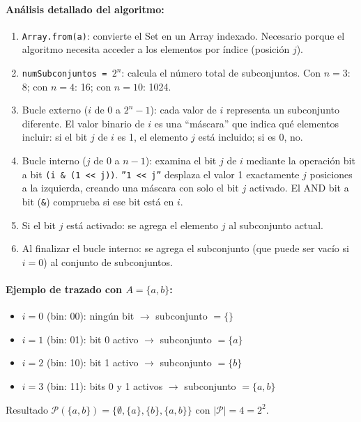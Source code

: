 \documentclass[11pt,a4paper]{article}
\begin{document}
\paragraph{Análisis detallado del algoritmo:}
\begin{enumerate}[noitemsep]
    \item \texttt{Array.from(a)}: convierte el Set en un Array indexado. Necesario porque el algoritmo necesita acceder a los elementos por índice (posición $j$).
    \item \texttt{numSubconjuntos = $2^n$}: calcula el número total de subconjuntos. Con $n=3$: 8; con $n=4$: 16; con $n=10$: 1024.
    \item Bucle externo ($i$ de 0 a $2^n-1$): cada valor de $i$ representa un subconjunto diferente. El valor binario de $i$ es una ``máscara'' que indica qué elementos incluir: si el bit $j$ de $i$ es 1, el elemento $j$ está incluido; si es 0, no.
    \item Bucle interno ($j$ de 0 a $n-1$): examina el bit $j$ de $i$ mediante la operación bit a bit \texttt{(i \& (1 \textless{}\textless{} j))}. \texttt{''1 \textless{}\textless{} j''} desplaza el valor 1 exactamente $j$ posiciones a la izquierda, creando una máscara con solo el bit $j$ activado. El AND bit a bit (\texttt{\&}) comprueba si ese bit está en $i$.
    \item Si el bit $j$ está activado: se agrega el elemento $j$ al subconjunto actual.
    \item Al finalizar el bucle interno: se agrega el subconjunto (que puede ser vacío si $i=0$) al conjunto de subconjuntos.
\end{enumerate}

\paragraph{Ejemplo de trazado con $A = \{a, b\}$:}
\begin{itemize}[noitemsep]
    \item $i=0$ (bin: 00): ningún bit $\rightarrow$ subconjunto $= \{\}$
    \item $i=1$ (bin: 01): bit 0 activo $\rightarrow$ subconjunto $= \{a\}$
    \item $i=2$ (bin: 10): bit 1 activo $\rightarrow$ subconjunto $= \{b\}$
    \item $i=3$ (bin: 11): bits 0 y 1 activos $\rightarrow$ subconjunto $= \{a, b\}$
\end{itemize}
Resultado $\mathcal{P}(\{a,b\}) = \{\emptyset, \{a\}, \{b\}, \{a,b\}\}$ con $|\mathcal{P}| = 4 = 2^2$.
\end{document}
